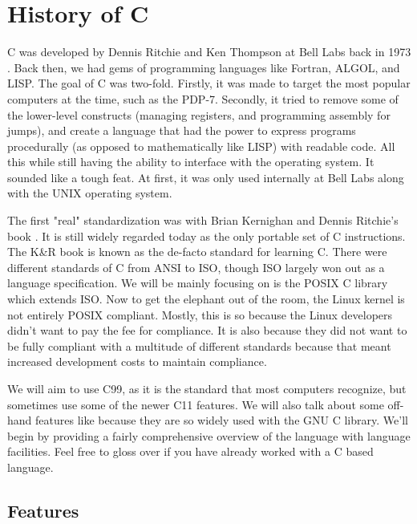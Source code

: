 \section{History of C}

C was developed by \gls{Dennis Ritchie} and \gls{Ken Thompson} at \gls{Bell Labs} back in 1973 \cite{Ritchie:1993:DCL:155360.155580}.
Back then, we had gems of programming languages like \gls{Fortran}, \gls{ALGOL}, and \gls{LISP}.
The goal of C was two-fold.
Firstly, it was made to target the most popular computers at the time, such as the \gls{PDP-7}.
Secondly, it tried to remove some of the lower-level constructs (managing \gls{registers}, and programming assembly for \gls{jumps}), and create a language that had the power to express programs procedurally (as opposed to mathematically like LISP) with readable code.
All this while still having the ability to interface with the operating system.
It sounded like a tough feat.
At first, it was only used internally at Bell Labs along with the UNIX operating system.

The first "real" standardization was with \gls{Brian Kernighan} and Dennis Ritchie's book \cite{kernighan1988c}.
It is still widely regarded today as the only \gls{portable} set of C instructions.
The K\&R book is known as the de-facto standard for learning C.
There were different standards of C from \gls{ANSI} to \gls{ISO}, though ISO largely won out as a language specification.
We will be mainly focusing on is the \gls{POSIX} C library which extends ISO.
Now to get the elephant out of the room, the \gls{Linux kernel} is not entirely POSIX compliant.
Mostly, this is so because the Linux developers didn't want to pay the fee for compliance.
It is also because they did not want to be fully compliant with a multitude of different standards because that meant increased development costs to maintain compliance.

We will aim to use C99, as it is the standard that most computers recognize, but sometimes use some of the newer C11 features.
We will also talk about some off-hand features like  because they are so widely used with the \gls{GNU C library}.
We'll begin by providing a fairly comprehensive overview of the language with language facilities.
Feel free to gloss over if you have already worked with a C based language.


\subsection{Features}

